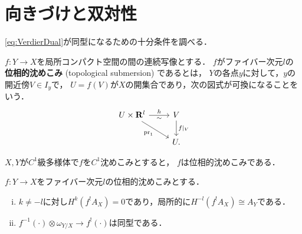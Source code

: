 \section{向きづけと双対性{\cite[3.3]{KS90}}}
\eqref{eq:VerdierDual}が同型になるための十分条件を調べる．
\begin{DFN}
    \(f\colon Y\to X\)を局所コンパクト空間の間の連続写像とする．
    \(f\)がファイバー次元\(l\)の
    \textbf{位相的沈めこみ} (topological submersion) であるとは，
    \(Y\)の各点\(y\)に対して，\(y\)の開近傍\(V\in I_y\)で，
    \(U=f(V)\)が\(X\)の開集合であり，次の図式が可換になることをいう．
    \[\begin{tikzcd}
        U\times \rr^l
        \arrow[rd,"\pr_1"']
        \arrow[r,"h", "\sim"']
        &
        V
        \arrow[d,"f\rvert_V"]
        \\
        {}&U. 
    \end{tikzcd}\]
\end{DFN}
\begin{EG*}
    \(X,Y\)が\(C^1\)級多様体で\(f\)を\(C^1\)沈めこみとすると，
    \(f\)は位相的沈めこみである．
\end{EG*}
\begin{PRP}
    \(f\colon Y\to X\)をファイバー次元\(l\)の位相的沈めこみとする．
    \begin{enumerate}[(i)]
        \item \(k\ne -l\)に対し\(H^k(f^!A_X)=0\)であり，局所的に\(H^{-l}(f^!A_X)\cong A_Y\)である．
        \item \(f^{-1}(\cdot)\otimes\omega_{Y/X}\to f^!(\cdot)\)は同型である．
    \end{enumerate}
\end{PRP}
